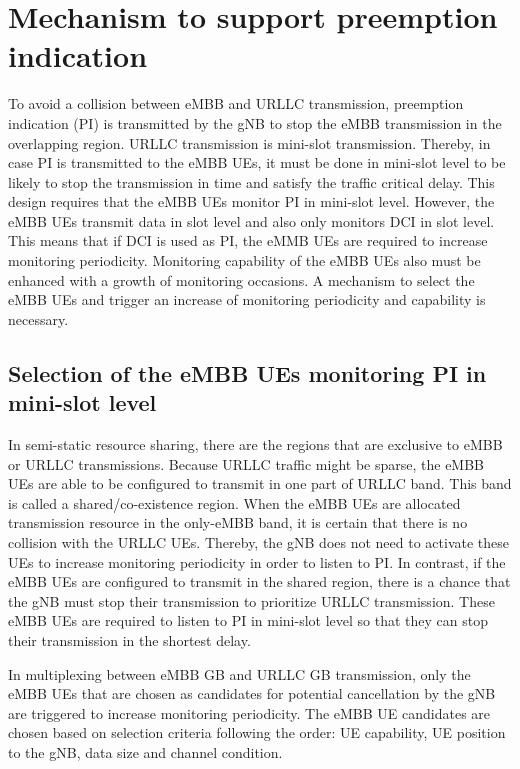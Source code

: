 \documentclass{report}
\begin{document}
\section{Mechanism to support preemption indication}\label{22}
To avoid a collision between eMBB and URLLC transmission, preemption indication (PI) is transmitted by the gNB to stop the eMBB transmission in the overlapping region. URLLC transmission is mini-slot transmission. Thereby, in case PI is transmitted to the eMBB UEs, it must be done in mini-slot level to be likely to stop the transmission in time and satisfy the traffic critical delay. This design requires that the eMBB UEs monitor PI in mini-slot level. However, the eMBB UEs transmit data in slot level and also only monitors DCI in slot level. This means that if DCI is used as PI, the eMMB UEs are required to increase monitoring periodicity. Monitoring capability of the eMBB UEs also must be enhanced with a growth of monitoring occasions. A mechanism to select the eMBB UEs and trigger an increase of monitoring periodicity and capability is necessary.

\subsection{Selection of the eMBB UEs monitoring PI in mini-slot level} \label{221}
In semi-static resource sharing, there are the regions that are exclusive to eMBB or URLLC transmissions. Because URLLC traffic might be sparse, the eMBB UEs are able to be configured to transmit in one part of URLLC band. This band is called a shared/co-existence region. When the eMBB UEs are allocated transmission resource in the only-eMBB band, it is certain that there is no collision with the URLLC UEs. Thereby, the gNB does not need to activate these UEs to increase monitoring periodicity in order to listen to PI. In contrast, if the eMBB UEs are configured to transmit in the shared region, there is a chance that the gNB must stop their transmission to prioritize URLLC transmission. These eMBB UEs are required to listen to PI in mini-slot level so that they can stop their transmission in the shortest delay.

In multiplexing between eMBB GB and URLLC GB transmission, only the eMBB UEs that are chosen as candidates for potential cancellation by the gNB are triggered to increase monitoring periodicity. The eMBB UE candidates are chosen based on selection criteria following the order: UE capability, UE position to the gNB, data size and channel condition.
\end{document}
